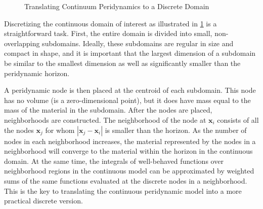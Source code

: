 \begin{figure}[htbp]
    \centering
    \begin{minipage}[b]{.3\linewidth}
        \resizebox{\linewidth}{!}{}
    \end{minipage}
    \begin{minipage}[b]{.3\linewidth}
    \end{minipage}
    \begin{minipage}[b]{.3\linewidth}
        \resizebox{\linewidth}{!}{}
    \end{minipage}
    \caption{Translating Continuum Peridynamics to a Discrete Domain}
    \label{fig:PDpotato}
    
\end{figure}

Discretizing the continuous domain of interest as illustrated in \cref{fig:PDpotato} is a straightforward task.
First, the entire domain is divided into small, non-overlapping subdomains.
Ideally, these subdomains are regular in size and compact in shape, and it is important that the largest dimension of a subdomain be similar to the smallest dimension as well as significantly smaller than the peridynamic horizon.

A peridynamic node is then placed at the centroid of each subdomain.
This node has no volume (is a zero-dimensional point), but it does have mass equal to the mass of the material in the subdomain.
After the nodes are placed, neighborhoods are constructed.
The neighborhood of the node at $\mathbf{x}_i$ consists of all the nodes $\mathbf{x}_j$ for whom $|\mathbf{x}_j-\mathbf{x}_i|$ is smaller than the horizon.
As the number of nodes in each neighborhood increases, the material represented by the nodes in a neighborhood will converge to the material within the horizon in the continuous domain.
At the same time, the integrals of well-behaved functions over neighborhood regions in the continuous model can be approximated by weighted sums of the same functions evaluated at the discrete nodes in a neighborhood.
This is the key to translating the continuous peridynamic model into a more practical discrete version.

